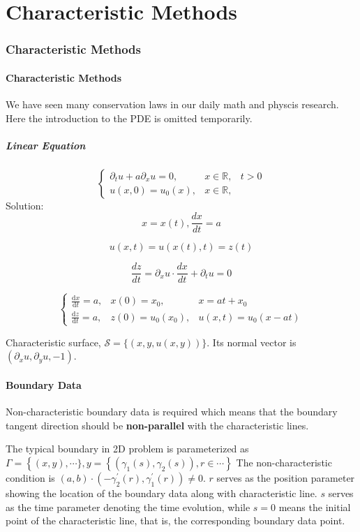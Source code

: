 \part{Characteristic Methods}
\section{Characteristic Methods}
\subsection{Characteristic Methods}
We have seen many conservation laws in our daily math and physcis research. Here the introduction to the PDE is omitted temporarily.
\subsubsection{Linear Equation}
\begin{example}
\begin{equation}
\left\{\begin{matrix}
	\partial_t u+a\partial_x u=0, &x\in \mathbb{R},  & t>0 \\ 
	u(x,0)=u_0(x), & x\in \mathbb{R}, & 
	\end{matrix}\right.
\end{equation}
Solution: $$x=x(t), \frac{dx}{dt}=a$$

$$u(x,t)=u(x(t),t)=z(t)$$

$$\frac{dz}{dt}=\partial_x u\cdot \frac{dx}{dt}+\partial_t u=0$$

$$
\left\{\begin{matrix}
\frac{\mathrm{d} x}{\mathrm{d} t}=a, &x(0)=x_0 ,  & x=at+x_0\\ 
\frac{\mathrm{d} z}{\mathrm{d} t}=a, & z(0)=u_0(x_0), & u(x,t)=u_0(x-at) 
\end{matrix}\right.
$$


\end{example}

Characteristic surface, $\mathcal{S}=\{(x, y, u(x, y))\}$. Its normal vector is $(\partial_x u, \partial_y u, -1)$.
\subsection{Boundary Data}
Non-characteristic boundary data is required which means that the boundary tangent direction should be \textbf{non-parallel} with the characteristic lines.

The typical boundary in 2D problem is parameterized as $\Gamma=\left\{(x, y), \cdots\},  y=\left\{\left(\gamma_{1}(s), \gamma_{2}(s)\right), r\in\cdots\right\}\right.$ The non-characteristic condition is $(a, b) \cdot\left(-\gamma_{2}^{\prime}(r), \gamma_{1}^{\prime}(r)\right) \neq 0$. $r$ serves as the position parameter showing the location of the boundary data along with characteristic line. $s$ serves as the time parameter denoting the time evolution, while $s=0$ means the initial point of the characteristic line, that is, the corresponding boundary data point.

